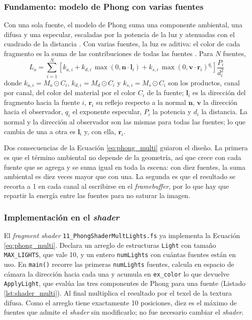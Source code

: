 \subsubsection{Fundamento: modelo de Phong con varias fuentes}
Con una sola fuente, el modelo de Phong suma una componente ambiental, una difusa y una especular, escaladas por la potencia de la luz y atenuadas con el cuadrado de la distancia \cite{hearn_baker}. Con varias fuentes, la luz es aditiva: el color de cada fragmento es la suma de las contribuciones de todas las fuentes \cite{learnopengl}. Para $N$ fuentes,
\begin{equation}
    L_o = \sum_{i=1}^{N} \left[ k_{a,i} + k_{d,i}\,\max(0, \mathbf{n} \cdot \mathbf{l}_i) + k_{s,i}\,\max(0, \mathbf{v} \cdot \mathbf{r}_i)^{q_i} \right] \frac{P_i}{d_i^2}
    \label{eq:phong_multi}
\end{equation}
donde $k_{a,i} = M_a \odot C_i$, $k_{d,i} = M_d \odot C_i$ y $k_{s,i} = M_s \odot C_i$ son los productos, canal por canal, del color del material por el color $C_i$ de la fuente; $\mathbf{l}_i$ es la dirección del fragmento hacia la fuente $i$, $\mathbf{r}_i$ su reflejo respecto a la normal $\mathbf{n}$, $\mathbf{v}$ la dirección hacia el observador, $q_i$ el exponente especular, $P_i$ la potencia y $d_i$ la distancia. La normal y la dirección al observador son las mismas para todas las fuentes; lo que cambia de una a otra es $\mathbf{l}_i$ y, con ella, $\mathbf{r}_i$.

Dos consecuencias de la Ecuación \ref{eq:phong_multi} guiaron el diseño. La primera es que el término ambiental no depende de la geometría, así que crece con cada fuente que se agrega y se suma igual en toda la escena: con diez fuentes, la suma ambiental es diez veces mayor que con una. La segunda es que el resultado se recorta a 1 en cada canal al escribirse en el \textit{framebuffer}, por lo que hay que repartir la energía entre las fuentes para no saturar la imagen.

\subsubsection{Implementación en el \textit{shader}}
El \textit{fragment shader} \texttt{11\_PhongShaderMultLights.fs} ya implementa la Ecuación \ref{eq:phong_multi}. Declara un arreglo de estructuras \texttt{Light} con tamaño \texttt{MAX\_LIGHTS}, que vale 10, y un entero \texttt{numLights} con cuántas fuentes están en uso. En \texttt{main()} recorre las primeras \texttt{numLights} fuentes, calcula en espacio de cámara la dirección hacia cada una y acumula en \texttt{ex\_color} lo que devuelve \texttt{ApplyLight}, que evalúa las tres componentes de Phong para una fuente (Listado \ref{lst:shader_multi}). Al final multiplica el resultado por el texel de la textura difusa. Como el arreglo tiene exactamente 10 posiciones, diez es el máximo de fuentes que admite el \textit{shader} sin modificarlo; no fue necesario cambiar el \textit{shader}.

